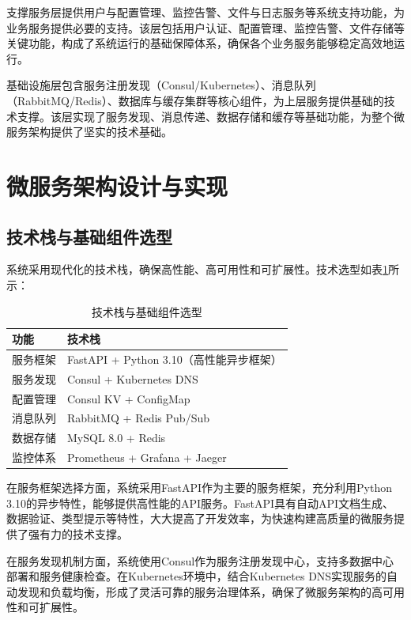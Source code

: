 支撑服务层提供用户与配置管理、监控告警、文件与日志服务等系统支持功能，为业务服务提供必要的支持。该层包括用户认证、配置管理、监控告警、文件存储等关键功能，构成了系统运行的基础保障体系，确保各个业务服务能够稳定高效地运行。

基础设施层包含服务注册发现（Consul/Kubernetes）、消息队列（RabbitMQ/Redis）、数据库与缓存集群等核心组件，为上层服务提供基础的技术支撑。该层实现了服务发现、消息传递、数据存储和缓存等基础功能，为整个微服务架构提供了坚实的技术基础。

\section{微服务架构设计与实现}

\subsection{技术栈与基础组件选型}

系统采用现代化的技术栈，确保高性能、高可用性和可扩展性。技术选型如表\ref{table:tech_stack}所示：

\begin{table}[H]
    \caption{技术栈与基础组件选型}
    \label{table:tech_stack}
    \centering
    \begin{tabular}{|l|l|}
        \hline
        \textbf{功能} & \textbf{技术栈} \\
        \hline
        服务框架 & FastAPI + Python 3.10（高性能异步框架） \\
        服务发现 & Consul + Kubernetes DNS \\
        配置管理 & Consul KV + ConfigMap \\
        消息队列 & RabbitMQ + Redis Pub/Sub \\
        数据存储 & MySQL 8.0 + Redis \\
        监控体系 & Prometheus + Grafana + Jaeger \\
        \hline
    \end{tabular}
\end{table}

在服务框架选择方面，系统采用FastAPI作为主要的服务框架，充分利用Python 3.10的异步特性，能够提供高性能的API服务。FastAPI具有自动API文档生成、数据验证、类型提示等特性，大大提高了开发效率，为快速构建高质量的微服务提供了强有力的技术支撑。

在服务发现机制方面，系统使用Consul作为服务注册发现中心，支持多数据中心部署和服务健康检查。在Kubernetes环境中，结合Kubernetes DNS实现服务的自动发现和负载均衡，形成了灵活可靠的服务治理体系，确保了微服务架构的高可用性和可扩展性。

